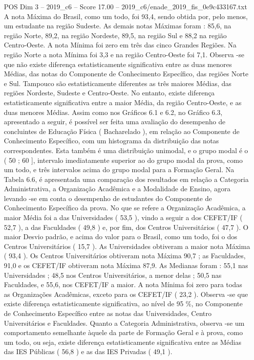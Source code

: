 \begin{textsample}{POS Dim 3 – 2019\_c6 – Score 17.00 – 2019\_c6/enade\_2019\_fis\_0e9c433167.txt}
A nota Máxima do Brasil, como um todo, foi 93,4, sendo obtida por, pelo menos, um estudante na região Sudeste.
As demais notas Máximas foram : 85,6, na região Norte, 89,2, na região Nordeste, 89,5, na região Sul e 88,2 na região Centro-Oeste.
A nota Mínima foi zero em três das cinco Grandes Regiões.
Na região Norte a nota Mínima foi 3,3 e na região Centro-Oeste foi 7,1.
Observa -se que não existe diferença estatisticamente significativa entre as duas menores Médias, das notas do Componente de Conhecimento Específico, das regiões Norte e Sul.
Tampouco são estatisticamente diferentes as três maiores Médias, das regiões Nordeste, Sudeste e Centro-Oeste.
No entanto, existe diferença estatisticamente significativa entre a maior Média, da região Centro-Oeste, e as duas menores Médias.
Assim como nos Gráficos 6.1 e 6.2, no Gráfico 6.3, apresentado a seguir, é possível ser feita uma avaliação do desempenho de concluintes de Educação Física ( Bacharelado ), em relação ao Componente de Conhecimento Específico, com um histograma da distribuição das notas correspondentes.
Esta também é uma distribuição unimodal, e o grupo modal é o ( 50 ; 60 ], intervalo imediatamente superior ao do grupo modal da prova, como um todo, e três intervalos acima do grupo modal para a Formação Geral.
Na Tabela 6.6, é apresentada uma comparação dos resultados em relação a Categoria Administrativa, a Organização Acadêmica e a Modalidade de Ensino, agora levando -se em conta o desempenho de estudantes do Componente de Conhecimento Específico da prova.
No que se refere a Organização Acadêmica, a maior Média foi a das Universidades ( 53,5 ), vindo a seguir a dos CEFET/IF ( 52,7 ), a das Faculdades ( 49,8 ) e, por fim, dos Centros Universitários ( 47,7 ).
O maior Desvio padrão, e acima do valor para o Brasil, como um todo, foi o dos Centros Universitários ( 15,7 ).
As Universidades obtiveram a maior nota Máxima ( 93,4 ).
Os Centros Universitários obtiveram nota Máxima 90,7 ; as Faculdades, 91,0 e os CEFET/IF obtiveram nota Máxima 87,9.
As Medianas foram : 55,1 nas Universidades ; 48,5 nos Centros Universitários, a menor delas ; 50,5 nas Faculdades, e 55,6, nos CEFET/IF a maior.
A nota Mínima foi zero para todas as Organizações Acadêmicas, exceto para os CEFET/IF ( 23,2 ).
Observa -se que existe diferença estatisticamente significativa, ao nível de 95 \%, no Componente de Conhecimento Específico entre as notas das Universidades, Centro Universitários e Faculdades.
Quanto a Categoria Administrativa, observa -se um comportamento semelhante àquele da parte de Formação Geral e à prova, como um todo, ou seja, existe diferença estatisticamente significativa entre as Médias das IES Públicas ( 56,8 ) e as das IES Privadas ( 49,1 ).

\end{textsample}
